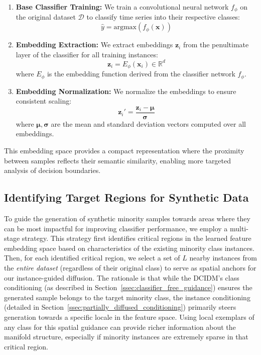 \documentclass{article}
\begin{document}
\begin{enumerate}
    \item \textbf{Base Classifier Training:} We train a convolutional neural network $f_\phi$ on the original dataset $\mathcal{D}$ to classify time series into their respective classes:
    \begin{equation}
    \hat{y} = \text{argmax}(f_\phi(\mathbf{x}))
    \end{equation}

    \item \textbf{Embedding Extraction:} We extract embeddings $\mathbf{z}_i$ from the penultimate layer of the classifier for all training instances:
    \begin{equation}
    \mathbf{z}_i = E_\phi(\mathbf{x}_i) \in \mathbb{R}^d
    \end{equation}
    where $E_\phi$ is the embedding function derived from the classifier network $f_\phi$.

    \item \textbf{Embedding Normalization:} We normalize the embeddings to ensure consistent scaling:
    \begin{equation}
    \mathbf{z}_i' = \frac{\mathbf{z}_i - \boldsymbol{\mu}}{\boldsymbol{\sigma}}
    \end{equation}
    where $\boldsymbol{\mu}, \boldsymbol{\sigma}$ are the mean and standard deviation vectors computed over all embeddings.
\end{enumerate}

This embedding space provides a compact representation where the proximity between samples reflects their semantic similarity, enabling more targeted analysis of decision boundaries.


\subsection{Identifying Target Regions for Synthetic Data}
\label{sec:identifying_target_regions} %

To guide the generation of synthetic minority samples towards areas where they can be most impactful for improving classifier performance, we employ a multi-stage strategy. This strategy first identifies critical regions in the learned feature embedding space based on characteristics of the existing minority class instances. Then, for each identified critical region, we select a set of $L$ nearby instances from the \textit{entire dataset} (regardless of their original class) to serve as spatial anchors for our instance-guided diffusion. The rationale is that while the DCIDM's class conditioning (as described in Section~\ref{ssec:classifier_free_guidance}) ensures the generated sample belongs to the target minority class, the instance conditioning (detailed in Section~\ref{ssec:partially_diffused_conditioning}) primarily steers generation towards a specific locale in the feature space. Using local exemplars of any class for this spatial guidance can provide richer information about the manifold structure, especially if minority instances are extremely sparse in that critical region.
\end{document}
